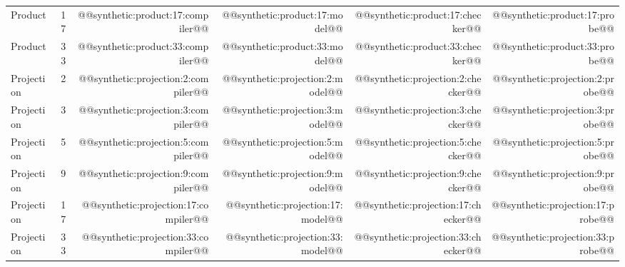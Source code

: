 \begin{longtable}{@{}lrrrrr@{}}
Product & 17 & @@synthetic:product:17:compiler@@ & @@synthetic:product:17:model@@ & @@synthetic:product:17:checker@@ & @@synthetic:product:17:probe@@ \\
Product & 33 & @@synthetic:product:33:compiler@@ & @@synthetic:product:33:model@@ & @@synthetic:product:33:checker@@ & @@synthetic:product:33:probe@@ \\
Projection & 2 & @@synthetic:projection:2:compiler@@ & @@synthetic:projection:2:model@@ & @@synthetic:projection:2:checker@@ & @@synthetic:projection:2:probe@@ \\
Projection & 3 & @@synthetic:projection:3:compiler@@ & @@synthetic:projection:3:model@@ & @@synthetic:projection:3:checker@@ & @@synthetic:projection:3:probe@@ \\
Projection & 5 & @@synthetic:projection:5:compiler@@ & @@synthetic:projection:5:model@@ & @@synthetic:projection:5:checker@@ & @@synthetic:projection:5:probe@@ \\
Projection & 9 & @@synthetic:projection:9:compiler@@ & @@synthetic:projection:9:model@@ & @@synthetic:projection:9:checker@@ & @@synthetic:projection:9:probe@@ \\
Projection & 17 & @@synthetic:projection:17:compiler@@ & @@synthetic:projection:17:model@@ & @@synthetic:projection:17:checker@@ & @@synthetic:projection:17:probe@@ \\
Projection & 33 & @@synthetic:projection:33:compiler@@ & @@synthetic:projection:33:model@@ & @@synthetic:projection:33:checker@@ & @@synthetic:projection:33:probe@@ \\
\end{longtable}
\endgroup
